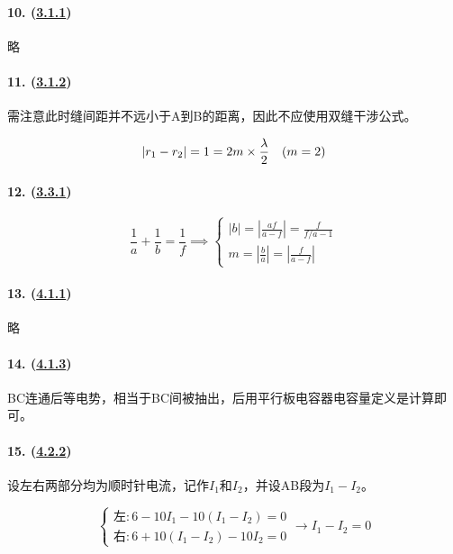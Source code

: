 \paragraph{10. (\hyperref[subsec:3.1.1]{3.1.1})} 略
\paragraph{11. (\hyperref[subsec:3.1.2]{3.1.2})} 需注意此时缝间距并不远小于A到B的距离，因此不应使用双缝干涉公式。

\begin{equation*}
    |r_1-r_2|=1=2m\times\frac\lambda2\quad(m=2)\\
\end{equation*}

\paragraph{12. (\hyperref[subsec:3.3.1]{3.3.1})}

\begin{equation*}
    \frac1a+\frac1b=\frac1f\implies
    \begin{cases}
        |b|=\left|\frac{af}{a-f}\right|=\frac{f}{f/a-1}\\
        m=\left|\frac{b}{a}\right|=\left|\frac{f}{a-f}\right|
    \end{cases}
\end{equation*}

\paragraph{13. (\hyperref[subsec:4.1.1]{4.1.1})} 略
\paragraph{14. (\hyperref[subsec:4.1.3]{4.1.3})} BC连通后等电势，相当于BC间被抽出，后用平行板电容器电容量定义是计算即可。

\paragraph{15. (\hyperref[subsec:4.2.2]{4.2.2})} 设左右两部分均为顺时针电流，记作$I_1$和$I_2$，并设AB段为$I_1-I_2$。

\begin{equation*}
    \begin{cases}
        \textrm{左}: 6-10I_1-10(I_1-I_2)=0\\
        \textrm{右}: 6+10(I_1-I_2)-10I_2=0
    \end{cases}\to
    I_1-I_2=0
\end{equation*}

